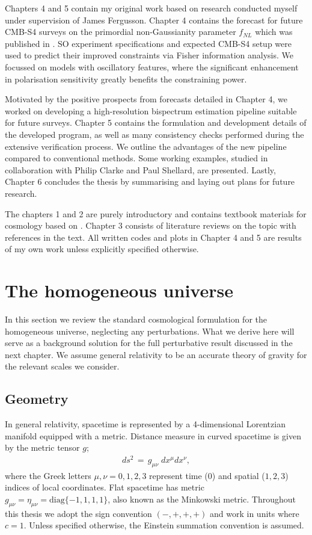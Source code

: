 Chapters 4 and 5 contain my original work based on research conducted myself under supervision of James Fergusson. Chapter 4 contains the forecast for future CMB-S4 surveys on the primordial non-Gaussianity parameter $f_{NL}$ which was published in \cite{Sohn2019}. SO experiment specifications and expected CMB-S4 setup were used to predict their improved constraints via Fisher information analysis. We focussed on models with oscillatory features, where the significant enhancement in polarisation sensitivity greatly benefits the constraining power.

Motivated by the positive prospects from forecasts detailed in Chapter 4, we worked on developing a high-resolution bispectrum estimation pipeline suitable for future surveys. Chapter 5 contains the formulation and development details of the developed program, as well as many consistency checks performed during the extensive verification process. We outline the advantages of the new pipeline compared to conventional methods. Some working examples, studied in collaboration with Philip Clarke and Paul Shellard, are presented. Lastly, Chapter 6 concludes the thesis by summarising and laying out plans for future research.

The chapters 1 and 2 are purely introductory and contains textbook materials for cosmology based on \cite{}. Chapter 3 consists of literature reviews on the topic with references in the text. All written codes and plots in Chapter 4 and 5 are results of my own work unless explicitly specified otherwise.


\section{The homogeneous universe}

In this section we review the standard cosmological formulation for the homogeneous universe, neglecting any perturbations. What we derive here will serve as a background solution for the full perturbative result discussed in the next chapter. We assume general relativity to be an accurate theory of gravity for the relevant scales we consider.

\subsection{Geometry}

In general relativity, spacetime is represented by a 4-dimensional Lorentzian manifold equipped with a metric. Distance measure in curved spacetime is given by the metric tensor $g$;
\begin{align}
	ds^2 \,=\, g_{\mu \nu} \; dx^\mu dx^\nu	,
\end{align}
where the Greek letters $\mu, \nu = 0,1,2,3$ represent time ($0$) and spatial ($1,2,3$) indices of local coordinates. Flat spacetime has metric $g_{\mu\nu} = \eta_{\mu\nu} = \text{diag}\{-1, 1, 1, 1\}$, also known as the Minkowski metric. Throughout this thesis we adopt the sign convention $(-, +, +, +)$ and work in units where $c=1$. Unless specified otherwise, the Einstein summation convention is assumed. 

